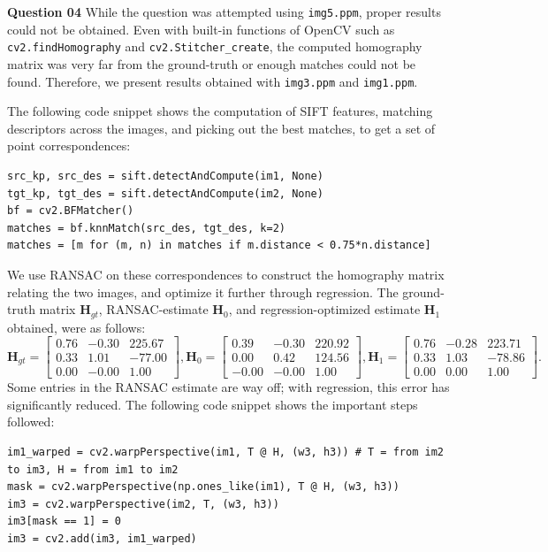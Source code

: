 \documentclass{article}[a4paper]
\begin{document}
    \textbf{Question 04} While the question was attempted using \texttt{img5.ppm}, proper results could not be obtained. Even with built-in functions of OpenCV such as \lstinline|cv2.findHomography| and \lstinline|cv2.Stitcher_create|, the computed homography matrix was very far from the ground-truth or enough matches could not be found. Therefore, we present results obtained with \texttt{img3.ppm} and \texttt{img1.ppm}.
	
	The following code snippet shows the computation of SIFT features, matching descriptors across the images, and picking out the best matches, to get a set of point correspondences:
	\begin{lstlisting}
src_kp, src_des = sift.detectAndCompute(im1, None)
tgt_kp, tgt_des = sift.detectAndCompute(im2, None)
bf = cv2.BFMatcher()
matches = bf.knnMatch(src_des, tgt_des, k=2)
matches = [m for (m, n) in matches if m.distance < 0.75*n.distance]
	\end{lstlisting}
	We use RANSAC on these correspondences to construct the homography matrix relating the two images, and optimize it further through regression. The ground-truth matrix $\mathbf{H}_{gt}$, RANSAC-estimate $\mathbf{H}_0$, and regression-optimized estimate $\mathbf{H}_1$ obtained, were as follows: \[
		\mathbf{H}_{gt} = \begin{bmatrix}
			0.76 & -0.30 & 225.67 \\
			0.33 &  1.01 & -77.00 \\
			0.00 & -0.00 &   1.00
		\end{bmatrix},
		\mathbf{H}_0 = \begin{bmatrix}
			0.39 & -0.30 & 220.92 \\
			0.00 &  0.42 & 124.56 \\
			-0.00 & -0.00 &   1.00
		\end{bmatrix},
		\mathbf{H}_1 = \begin{bmatrix}
			0.76 & -0.28 & 223.71 \\
			0.33 &  1.03 & -78.86 \\
			0.00 &  0.00 &   1.00
		\end{bmatrix}.
	\] Some entries in the RANSAC estimate are way off; with regression, this error has significantly reduced. The following code snippet shows the important steps followed:
	\begin{lstlisting}
im1_warped = cv2.warpPerspective(im1, T @ H, (w3, h3)) # T = from im2 to im3, H = from im1 to im2
mask = cv2.warpPerspective(np.ones_like(im1), T @ H, (w3, h3))
im3 = cv2.warpPerspective(im2, T, (w3, h3))
im3[mask == 1] = 0
im3 = cv2.add(im3, im1_warped)
	\end{lstlisting}
	
\end{document}
